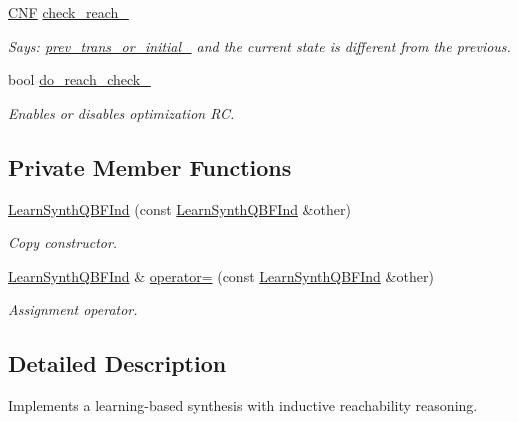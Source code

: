 \begin{DoxyCompactItemize}
\hyperlink{classCNF}{C\-N\-F} \hyperlink{classLearnSynthQBFInd_a6854254065f912e3d5fe07a1b895f1c6}{check\-\_\-reach\-\_\-}
\begin{DoxyCompactList}\small\item\em Says\-: \hyperlink{classLearnSynthQBFInd_ad99eafb7ee9134115f9fbe986e5eb0c5}{prev\-\_\-trans\-\_\-or\-\_\-initial\-\_\-} and the current state is different from the previous. \end{DoxyCompactList}\item 
bool \hyperlink{classLearnSynthQBFInd_af87e4a2c1d17c4c5bc398082d6d3e365}{do\-\_\-reach\-\_\-check\-\_\-}
\begin{DoxyCompactList}\small\item\em Enables or disables optimization R\-C. \end{DoxyCompactList}\end{DoxyCompactItemize}
\subsection*{Private Member Functions}
\begin{DoxyCompactItemize}
\item 
\hyperlink{classLearnSynthQBFInd_a55edd29ba2b93167b7d7b2bf6b835673}{Learn\-Synth\-Q\-B\-F\-Ind} (const \hyperlink{classLearnSynthQBFInd}{Learn\-Synth\-Q\-B\-F\-Ind} \&other)
\begin{DoxyCompactList}\small\item\em Copy constructor. \end{DoxyCompactList}\item 
\hyperlink{classLearnSynthQBFInd}{Learn\-Synth\-Q\-B\-F\-Ind} \& \hyperlink{classLearnSynthQBFInd_a411e8fa65ea22877c0fa9180f31120f9}{operator=} (const \hyperlink{classLearnSynthQBFInd}{Learn\-Synth\-Q\-B\-F\-Ind} \&other)
\begin{DoxyCompactList}\small\item\em Assignment operator. \end{DoxyCompactList}\end{DoxyCompactItemize}


\subsection{Detailed Description}
Implements a learning-\/based synthesis with inductive reachability reasoning. 

